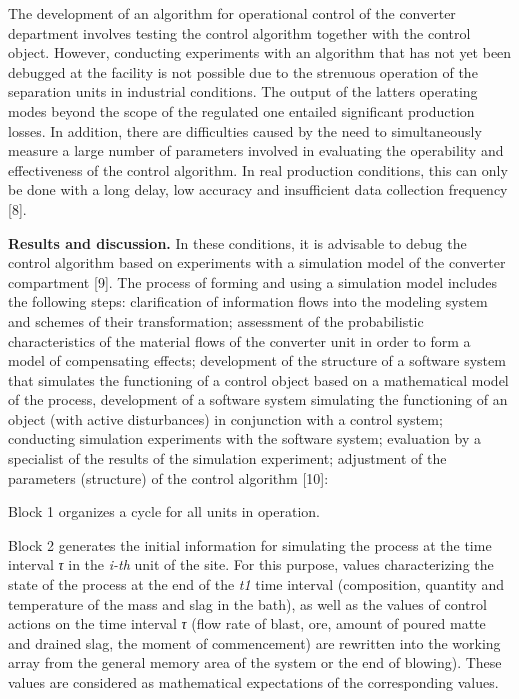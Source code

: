 The development of an algorithm for operational control of the converter
department involves testing the control algorithm together with the
control object. However, conducting experiments with an algorithm that
has not yet been debugged at the facility is not possible due to the
strenuous operation of the separation units in industrial conditions.
The output of the latter\textquotesingle s operating modes beyond the
scope of the regulated one entailed significant production losses. In
addition, there are difficulties caused by the need to simultaneously
measure a large number of parameters involved in evaluating the
operability and effectiveness of the control algorithm. In real
production conditions, this can only be done with a long delay, low
accuracy and insufficient data collection frequency {[}8{]}.

\textbf{Results and discussion.} In these conditions, it is advisable to
debug the control algorithm based on experiments with a simulation model
of the converter compartment {[}9{]}. The process of forming and using a
simulation model includes the following steps: clarification of
information flows into the modeling system and schemes of their
transformation; assessment of the probabilistic characteristics of the
material flows of the converter unit in order to form a model of
compensating effects; development of the structure of a software system
that simulates the functioning of a control object based on a
mathematical model of the process, development of a software system
simulating the functioning of an object (with active disturbances) in
conjunction with a control system; conducting simulation experiments
with the software system; evaluation by a specialist of the results of
the simulation experiment; adjustment of the parameters (structure) of
the control algorithm {[}10{]}:

Block 1 organizes a cycle for all units in operation.

Block 2 generates the initial information for simulating the process at
the time interval \emph{τ} in the \emph{i-th} unit of the site. For this
purpose, values characterizing the state of the process at the end of
the \emph{t1} time interval (composition, quantity and temperature of
the mass and slag in the bath), as well as the values of control actions
on the time interval \emph{τ} (flow rate of blast, ore, amount of poured
matte and drained slag, the moment of commencement) are rewritten into
the working array from the general memory area of the system or the end
of blowing). These values are considered as mathematical expectations of
the corresponding values.

